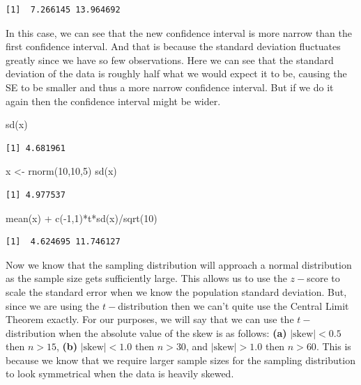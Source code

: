 \documentclass[
  letterpaper,
  DIV=11,
  numbers=noendperiod]{scrreprt}
\newenvironment{Shaded}{\begin{snugshade}}{\end{snugshade}}
\newcommand{\DecValTok}[1]{\textcolor[rgb]{0.68,0.00,0.00}{#1}}
\newcommand{\FunctionTok}[1]{\textcolor[rgb]{0.28,0.35,0.67}{#1}}
\newcommand{\NormalTok}[1]{\textcolor[rgb]{0.00,0.23,0.31}{#1}}
\newcommand{\OtherTok}[1]{\textcolor[rgb]{0.00,0.23,0.31}{#1}}
\newcommand{\SpecialCharTok}[1]{\textcolor[rgb]{0.37,0.37,0.37}{#1}}
\begin{document}
\begin{verbatim}
[1]  7.266145 13.964692
\end{verbatim}

In this case, we can see that the new confidence interval is more narrow
than the first confidence interval. And that is because the standard
deviation fluctuates greatly since we have so few observations. Here we
can see that the standard deviation of the data is roughly half what we
would expect it to be, causing the SE to be smaller and thus a more
narrow confidence interval. But if we do it again then the confidence
interval might be wider.

\begin{Shaded}
\begin{Highlighting}[]
\FunctionTok{sd}\NormalTok{(x)}
\end{Highlighting}
\end{Shaded}

\begin{verbatim}
[1] 4.681961
\end{verbatim}

\begin{Shaded}
\begin{Highlighting}[]
\NormalTok{x }\OtherTok{\textless{}{-}} \FunctionTok{rnorm}\NormalTok{(}\DecValTok{10}\NormalTok{,}\DecValTok{10}\NormalTok{,}\DecValTok{5}\NormalTok{)}
\FunctionTok{sd}\NormalTok{(x)}
\end{Highlighting}
\end{Shaded}

\begin{verbatim}
[1] 4.977537
\end{verbatim}

\begin{Shaded}
\begin{Highlighting}[]
\FunctionTok{mean}\NormalTok{(x) }\SpecialCharTok{+} \FunctionTok{c}\NormalTok{(}\SpecialCharTok{{-}}\DecValTok{1}\NormalTok{,}\DecValTok{1}\NormalTok{)}\SpecialCharTok{*}\NormalTok{t}\SpecialCharTok{*}\FunctionTok{sd}\NormalTok{(x)}\SpecialCharTok{/}\FunctionTok{sqrt}\NormalTok{(}\DecValTok{10}\NormalTok{)}
\end{Highlighting}
\end{Shaded}

\begin{verbatim}
[1]  4.624695 11.746127
\end{verbatim}

Now we know that the sampling distribution will approach a normal
distribution as the sample size gets sufficiently large. This allows us
to use the \(z-\)score to scale the standard error when we know the
population standard deviation. But, since we are using the
\(t-\)distribution then we can't quite use the Central Limit Theorem
exactly. For our purposes, we will say that we can use the
\(t-\)distribution when the absolute value of the skew is as follows:
\textbf{(a)} \(|\text{skew}|< 0.5\) then \(n>15\), \textbf{(b)}
\(|\text{skew}|< 1.0\) then \(n>30\), and \(|\text{skew}|> 1.0\) then
\(n>60\). This is because we know that we require larger sample sizes
for the sampling distribution to look symmetrical when the data is
heavily skewed.
\end{document}
